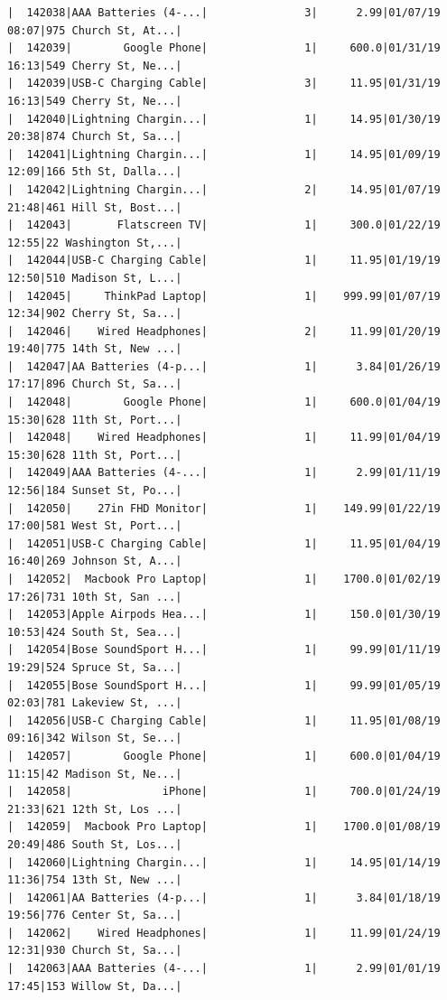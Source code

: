 \documentclass[
  letterpaper,
  DIV=11,
  numbers=noendperiod]{scrartcl}
\begin{document}
\begin{verbatim}
|  142038|AAA Batteries (4-...|               3|      2.99|01/07/19 08:07|975 Church St, At...|
|  142039|        Google Phone|               1|     600.0|01/31/19 16:13|549 Cherry St, Ne...|
|  142039|USB-C Charging Cable|               3|     11.95|01/31/19 16:13|549 Cherry St, Ne...|
|  142040|Lightning Chargin...|               1|     14.95|01/30/19 20:38|874 Church St, Sa...|
|  142041|Lightning Chargin...|               1|     14.95|01/09/19 12:09|166 5th St, Dalla...|
|  142042|Lightning Chargin...|               2|     14.95|01/07/19 21:48|461 Hill St, Bost...|
|  142043|       Flatscreen TV|               1|     300.0|01/22/19 12:55|22 Washington St,...|
|  142044|USB-C Charging Cable|               1|     11.95|01/19/19 12:50|510 Madison St, L...|
|  142045|     ThinkPad Laptop|               1|    999.99|01/07/19 12:34|902 Cherry St, Sa...|
|  142046|    Wired Headphones|               2|     11.99|01/20/19 19:40|775 14th St, New ...|
|  142047|AA Batteries (4-p...|               1|      3.84|01/26/19 17:17|896 Church St, Sa...|
|  142048|        Google Phone|               1|     600.0|01/04/19 15:30|628 11th St, Port...|
|  142048|    Wired Headphones|               1|     11.99|01/04/19 15:30|628 11th St, Port...|
|  142049|AAA Batteries (4-...|               1|      2.99|01/11/19 12:56|184 Sunset St, Po...|
|  142050|    27in FHD Monitor|               1|    149.99|01/22/19 17:00|581 West St, Port...|
|  142051|USB-C Charging Cable|               1|     11.95|01/04/19 16:40|269 Johnson St, A...|
|  142052|  Macbook Pro Laptop|               1|    1700.0|01/02/19 17:26|731 10th St, San ...|
|  142053|Apple Airpods Hea...|               1|     150.0|01/30/19 10:53|424 South St, Sea...|
|  142054|Bose SoundSport H...|               1|     99.99|01/11/19 19:29|524 Spruce St, Sa...|
|  142055|Bose SoundSport H...|               1|     99.99|01/05/19 02:03|781 Lakeview St, ...|
|  142056|USB-C Charging Cable|               1|     11.95|01/08/19 09:16|342 Wilson St, Se...|
|  142057|        Google Phone|               1|     600.0|01/04/19 11:15|42 Madison St, Ne...|
|  142058|              iPhone|               1|     700.0|01/24/19 21:33|621 12th St, Los ...|
|  142059|  Macbook Pro Laptop|               1|    1700.0|01/08/19 20:49|486 South St, Los...|
|  142060|Lightning Chargin...|               1|     14.95|01/14/19 11:36|754 13th St, New ...|
|  142061|AA Batteries (4-p...|               1|      3.84|01/18/19 19:56|776 Center St, Sa...|
|  142062|    Wired Headphones|               1|     11.99|01/24/19 12:31|930 Church St, Sa...|
|  142063|AAA Batteries (4-...|               1|      2.99|01/01/19 17:45|153 Willow St, Da...|

\end{verbatim}
\end{document}
